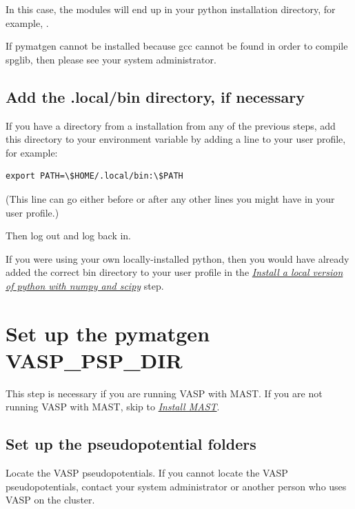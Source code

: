 \documentclass[letterpaper,10pt,english]{sphinxmanual}
\begin{document}
In this case, the modules will end up in your python installation directory, for example, .

If pymatgen cannot be installed because gcc cannot be found in order to compile spglib, then please see your system administrator.


\subsection{Add the .local/bin directory, if necessary}
\label{1_0_installation:add-local-bin}\label{1_0_installation:add-the-local-bin-directory-if-necessary}
If you have a  directory from a  installation from any of the previous steps, add this directory to your  environment variable by adding a line to your user profile, for example:

\begin{Verbatim}[commandchars=\\\{\}]
export PATH=\$HOME/.local/bin:\$PATH
\end{Verbatim}

(This line can go either before or after any other  lines you might have in your user profile.)

Then log out and log back in.

If you were using your own locally-installed python, then you would have already added the correct bin directory to your user profile in the {\hyperref[1_0_installation:install-local-python]{\emph{Install a local version of python with numpy and scipy}}} step.


\section{Set up the pymatgen VASP\_PSP\_DIR}
\label{1_0_installation:vasp-psp-dir}\label{1_0_installation:set-up-the-pymatgen-vasp-psp-dir}
This step is necessary if you are running VASP with MAST. If you are not running VASP with MAST, skip to {\hyperref[1_0_installation:install-mast]{\emph{Install MAST}}}.


\subsection{Set up the pseudopotential folders}
\label{1_0_installation:set-up-the-pseudopotential-folders}
Locate the VASP pseudopotentials. If you cannot locate the VASP pseudopotentials, contact your system administrator or another person who uses VASP on the cluster.
\end{document}
